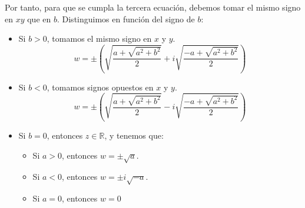 \begin{ejercicio}
    Por tanto, para que se cumpla la tercera ecuación, debemos tomar el mismo signo en $xy$ que en $b$. Distinguimos en función del signo de $b$:
    \begin{itemize}
        \item Si $b> 0$, tomamos el mismo signo en $x$ y $y$.
        \begin{equation*}
            w = \pm \left(\sqrt{\frac{a + \sqrt{a^2+b^2}}{2}} + i\sqrt{\frac{-a + \sqrt{a^2+b^2}}{2}}\right)
        \end{equation*}
        \item Si $b< 0$, tomamos signos opuestos en $x$ y $y$.
        \begin{equation*}
            w = \pm \left(\sqrt{\frac{a + \sqrt{a^2+b^2}}{2}} - i\sqrt{\frac{-a + \sqrt{a^2+b^2}}{2}}\right)
        \end{equation*}
        \item Si $b=0$, entonces $z\in \mathbb{R}$, y tenemos que:
        \begin{itemize}
            \item Si $a>0$, entonces $w = \pm \sqrt{a}$.
            \item Si $a<0$, entonces $w = \pm i\sqrt{-a}$.
            \item Si $a=0$, entonces $w = 0$
        \end{itemize}
    \end{itemize}
\end{ejercicio}
